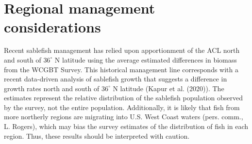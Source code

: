 \documentclass[11pt,
  english,
  a4paper,
]{article}
\begin{document}
\leavevmode\tagmcend\tagstructend


 

\leavevmode\tagmcend\tagstructend\par


\hypertarget{regional-management-considerations}{%
\section{Regional management considerations}\label{regional-management-considerations}}

\leavevmode\tagmcend\tagstructend


Recent sablefish management has relied upon apportionment of the ACL north and south of {\(36^\circ\)\leavevmode\tagmcend\tagstructend} N latitude using the average estimated differences in biomass from the WCGBT Survey. This historical management line corresponds with a recent data-driven analysis of sablefish growth that suggests a difference in growth rates north and south of {\(36^\circ\)\leavevmode\tagmcend\tagstructend} N latitude ({Kapur et al. (2020)\leavevmode\tagmcend\tagstructend}). The estimates represent the relative distribution of the sablefish population observed by the survey, not the entire population. Additionally, it is likely that fish from more northerly regions are migrating into U.S. West Coast waters (pers. comm., L. Rogers), which may bias the survey estimates of the distribution of fish in each region. Thus, these results should be interpreted with caution.

\leavevmode\tagmcend\tagstructend\par

\end{document}
